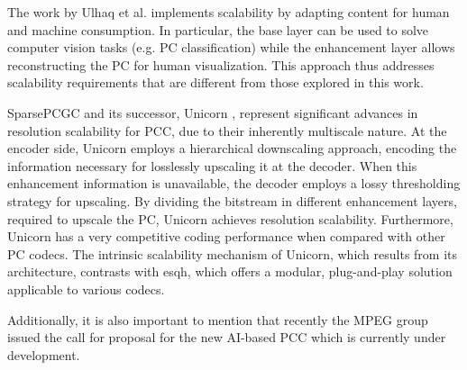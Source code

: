 The work by Ulhaq et al. \cite{ulhaq2024scalable} implements scalability by adapting content for human and machine consumption. In particular, the base layer can be used to solve computer vision tasks (e.g. PC classification) while the enhancement layer allows reconstructing the PC for human visualization. This approach thus addresses scalability requirements that are different from those explored in this work.

SparsePCGC \cite{wang2022sparse} and its successor, Unicorn \cite{wang2024versatile1,wang2024versatile2}, represent significant advances in resolution scalability for PCC, due to their inherently multiscale nature. At the encoder side, Unicorn employs a hierarchical downscaling approach, encoding the information necessary for losslessly upscaling it at the decoder.
When this enhancement information is unavailable, the decoder employs a lossy thresholding strategy for upscaling.
By dividing the bitstream in different enhancement layers, required to upscale the PC, Unicorn achieves resolution scalability. Furthermore, Unicorn has a very competitive coding performance when compared with other PC codecs. The intrinsic scalability mechanism of Unicorn, which results from its architecture, contrasts with \gls{esqh}, which offers a modular, plug-and-play solution applicable to various codecs.

Additionally, it is also important to mention that recently the MPEG group issued the call for proposal for the new AI-based PCC \cite{aigccfp} which is currently under development.